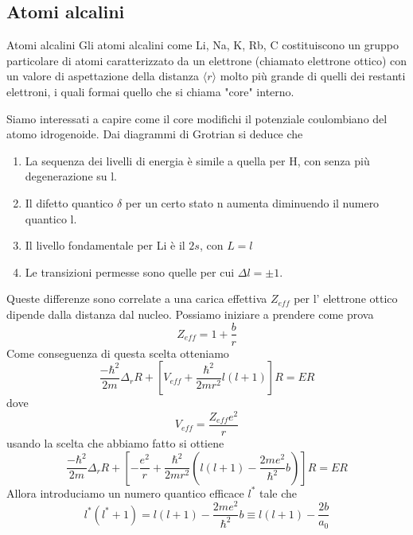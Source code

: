 \documentclass[11pt,a4paper]{article}
\theoremstyle{springer}
\theoremstyle{definition}
\theoremstyle{remark}
\begin{document}
\subsection{Atomi alcalini}
\begin{theorybox}{Atomi alcalini}
  Gli atomi alcalini come Li, Na, K, Rb, C costituiscono un gruppo particolare di atomi caratterizzato da un elettrone (chiamato elettrone ottico) con un valore di aspettazione della distanza $\langle r \rangle$ molto più grande di quelli dei restanti elettroni, i quali formai quello che si chiama "core" interno.
\end{theorybox}
Siamo interessati a capire come il core modifichi il potenziale coulombiano del atomo idrogenoide.
Dai diagrammi di Grotrian si deduce che 
\begin{enumerate}
  \item La sequenza dei livelli di energia è simile a quella per H, con senza più degenerazione su l.
  \item Il difetto quantico $\delta$ per un certo stato n aumenta diminuendo il numero quantico l.
    \item Il livello fondamentale per Li è il $2s$, con $L=l$
    \item Le transizioni permesse sono quelle per cui $\Delta l = \pm 1$.
\end{enumerate}
Queste differenze sono correlate a una carica effettiva $Z_{eff}$ per l' elettrone ottico dipende dalla distanza dal nucleo. Possiamo iniziare a prendere come prova 
\begin{equation*}
  Z_{eff} = 1+\frac{b}{r}
\end{equation*}
Come conseguenza di questa scelta otteniamo
\begin{equation*}
  \frac{-\hbar^2}{2m}\Delta_r R +\left[ V_{eff} + \frac{\hbar^2}{2mr^2}l(l+1) \right]R = ER
\end{equation*}
dove 
\begin{equation*}
  V_{eff} = \frac{Z_{eff}e^2}{r}
\end{equation*}
usando la scelta che abbiamo fatto si ottiene
\begin{equation*}
   \frac{-\hbar^2}{2m}\Delta_r R +\left[ - \frac{e^2}{r}+ \frac{\hbar^2}{2mr^2}\left(l(l+1)-\frac{2me^2}{\hbar^2}b\right) \right]R = ER
\end{equation*}
Allora introduciamo un numero quantico efficace $l^*$ tale che 
\begin{equation*}
  l^*(l^*+1) = l(l+1)-\frac{2me^2}{\hbar^2}b \equiv l(l+1)-\frac{2b}{a_0}
\end{equation*}
\end{document}
